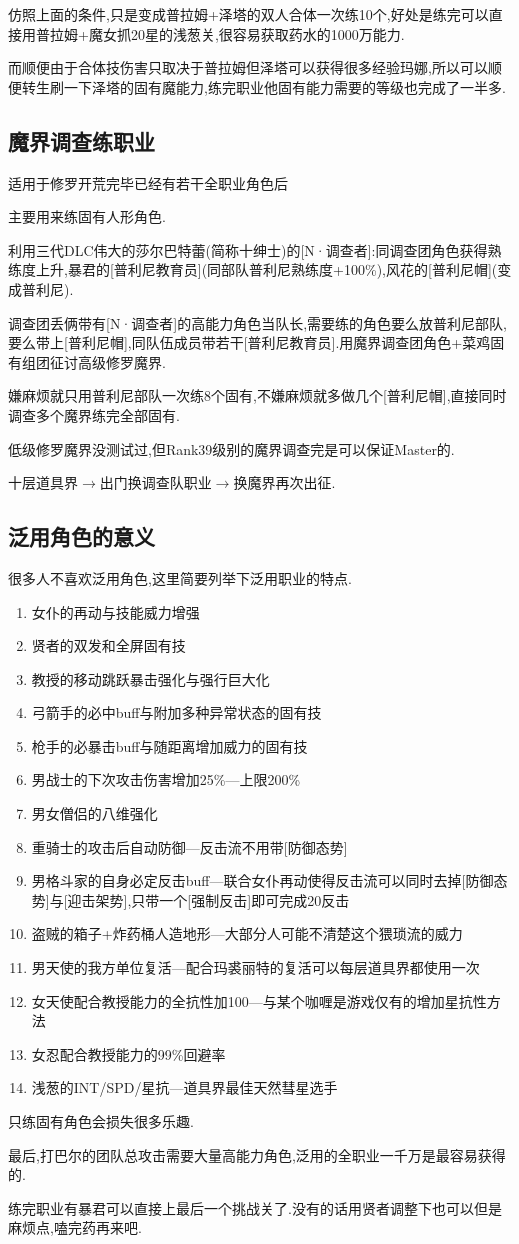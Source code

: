 	仿照上面的条件,只是变成普拉姆+泽塔的双人合体一次练10个,好处是练完可以直接用普拉姆+魔女抓20星的浅葱关,很容易获取药水的1000万能力.

	而顺便由于合体技伤害只取决于普拉姆但泽塔可以获得很多经验玛娜,所以可以顺便转生刷一下泽塔的固有魔能力,练完职业他固有能力需要的等级也完成了一半多.

	\subsection{魔界调查练职业}

	{\color{red}适用于修罗开荒完毕已经有若干全职业角色后}

	主要用来练固有人形角色.

	利用三代DLC伟大的莎尔巴特蕾(简称十绅士)的[N·调查者]:同调查团角色获得熟练度上升,暴君的[普利尼教育员](同部队普利尼熟练度+100\%),风花的[普利尼帽](变成普利尼).
	
	调查团丢俩带有[N·调查者]的高能力角色当队长,需要练的角色要么放普利尼部队,要么带上[普利尼帽],同队伍成员带若干[普利尼教育员].用魔界调查团角色+菜鸡固有组团征讨高级修罗魔界.

	嫌麻烦就只用普利尼部队一次练8个固有,不嫌麻烦就多做几个[普利尼帽],直接同时调查多个魔界练完全部固有.

	低级修罗魔界没测试过,但Rank39级别的魔界调查完是可以保证Master的.

	十层道具界$\longrightarrow$出门换调查队职业$\longrightarrow$换魔界再次出征.

	\newpage

	\subsection{泛用角色的意义}

	很多人不喜欢泛用角色,这里简要列举下泛用职业的特点.

	\begin{enumerate}
		\item 女仆的再动与技能威力增强
		\item 贤者的双发和全屏固有技
		\item 教授的移动跳跃暴击强化与强行巨大化
		\item 弓箭手的必中buff与附加多种异常状态的固有技
		\item 枪手的必暴击buff与随距离增加威力的固有技
		\item 男战士的下次攻击伤害增加25\%---上限200\%
		\item 男女僧侣的八维强化
		\item 重骑士的攻击后自动防御---反击流不用带[防御态势]
		\item 男格斗家的自身必定反击buff---联合女仆再动使得反击流可以同时去掉[防御态势]与[迎击架势],只带一个[强制反击]即可完成20反击
		\item 盗贼的箱子+炸药桶人造地形---大部分人可能不清楚这个猥琐流的威力
		\item 男天使的我方单位复活---配合玛裘丽特的复活可以每层道具界都使用一次
		\item 女天使配合教授能力的全抗性加100---与某个咖喱是游戏仅有的增加星抗性方法
		\item 女忍配合教授能力的99\%回避率
		\item 浅葱的INT/SPD/星抗---道具界最佳天然彗星选手
	\end{enumerate}
	
	只练固有角色会损失很多乐趣.

	最后,打巴尔的团队总攻击需要大量高能力角色,泛用的全职业一千万是最容易获得的.

练完职业有暴君可以直接上最后一个挑战关了.没有的话用贤者调整下也可以但是麻烦点,嗑完药再来吧.
